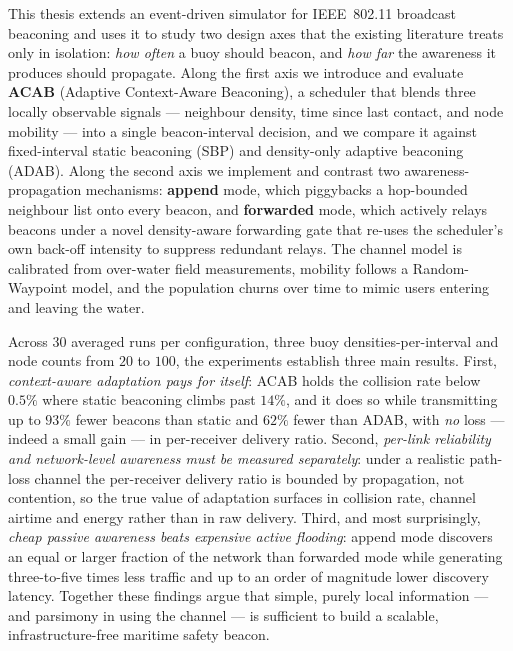 \documentclass[12pt,a4paper,oneside]{report}
\begin{document}
This thesis extends an event-driven simulator for IEEE~802.11 broadcast
beaconing and uses it to study two design axes that the existing literature
treats only in isolation: \emph{how often} a buoy should beacon, and \emph{how
far} the awareness it produces should propagate. Along the first axis we
introduce and evaluate \textbf{ACAB} (Adaptive Context-Aware Beaconing), a
scheduler that blends three locally observable signals --- neighbour density,
time since last contact, and node mobility --- into a single beacon-interval
decision, and we compare it against fixed-interval static beaconing (SBP) and
density-only adaptive beaconing (ADAB). Along the second axis we implement and
contrast two awareness-propagation mechanisms: \textbf{append} mode, which
piggybacks a hop-bounded neighbour list onto every beacon, and
\textbf{forwarded} mode, which actively relays beacons under a novel
density-aware forwarding gate that re-uses the scheduler's own back-off
intensity to suppress redundant relays. The channel model is calibrated from
over-water field measurements, mobility follows a Random-Waypoint model, and
the population churns over time to mimic users entering and leaving the water.

Across $30$ averaged runs per configuration, three buoy densities-per-interval
and node counts from $20$ to $100$, the experiments establish three main
results. First, \emph{context-aware adaptation pays for itself}: ACAB holds the
collision rate below $0.5\%$ where static beaconing climbs past $14\%$, and it
does so while transmitting up to $93\%$ fewer beacons than static and $62\%$
fewer than ADAB, with \emph{no} loss --- indeed a small gain --- in
per-receiver delivery ratio. Second, \emph{per-link reliability and
network-level awareness must be measured separately}: under a realistic
path-loss channel the per-receiver delivery ratio is bounded by propagation,
not contention, so the true value of adaptation surfaces in collision rate,
channel airtime and energy rather than in raw delivery. Third, and most
surprisingly, \emph{cheap passive awareness beats expensive active flooding}:
append mode discovers an equal or larger fraction of the network than forwarded
mode while generating three-to-five times less traffic and up to an order of
magnitude lower discovery latency. Together these findings argue that simple,
purely local information --- and parsimony in using the channel --- is
sufficient to build a scalable, infrastructure-free maritime safety beacon.

\clearpage
\tableofcontents
\listoffigures
\listoftables
\end{document}
